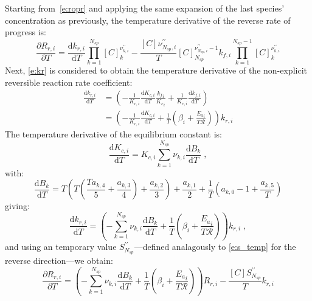 \documentclass[12pt,number,sort&compress]{elsarticle}
\newcommand{\ns}{N_{sp}}
\newcommand{\Ru}{\mathcal{R}}
\begin{document}
Starting from~\cref{e:ropr} and applying the same expansion of the last species' concentration as previously, the temperature derivative of the reverse rate of progress is:
\begin{equation}
 \label{e:droprdt_1}
 \frac{\partial R_{r, i}}{\partial T } = \frac{\text{d} k_{r, i} }{\text{d} T } \prod_{k=1}^{\ns} [C]_{k}^{\nu^{\prime\prime}_{k,i}} - \frac{[C] \nu^{\prime\prime}_{\ns,i}}{T} [C]_{\ns}^{\nu^{\prime\prime}_{\ns,i} - 1} {k_{f, i}} \prod_{k=1}^{\ns  - 1} [C]_{k}^{\nu^{\prime\prime}_{k,i}}
\end{equation}
Next, \cref{e:kr} is considered to obtain the temperature derivative of the non-explicit reversible reaction rate coefficient:
\begin{align}
 \frac{\text{d} k_{r, i} }{\text{d} T } &= \left(- \frac{1}{{K_{c, i}}} \frac{\text{d} {K_{c, i}} }{\text{d} T } \frac{{k_f}_i}{{K_c}_i} + \frac{1}{{K_{c, i}}}\frac{\text{d} {k_{f, i}} }{\text{d} T } \right) \nonumber \\
				         &= \left(- \frac{1}{{K_{c, i}}} \frac{\text{d} {K_{c, i}} }{\text{d} T } + \frac{1}{T} \left(\beta_{i} + \frac{{E_{a}}_{i}}{T \Ru}\right)\right) {k_{r, i}}
\end{align}
The temperature derivative of the equilibrium constant is:
\begin{equation}
 \frac{\text{d} {K_{c, i}} }{\text{d} T } = {K_{c, i}} \sum_{k=1}^{\ns} \nu_{k,i} \frac{\text{d} B_{k} }{\text{d} T } \;,
\end{equation}
with:
\begin{equation}
 \frac{\text{d} B_{k} }{\text{d} T } = T \left(T \left(\frac{T a_{k,4}}{5} + \frac{a_{k,3}}{4}\right) + \frac{a_{k,2}}{3}\right) + \frac{a_{k,1}}{2} + \frac{1}{T} \left(a_{k,0} - 1 + \frac{a_{k,5}}{T}\right)
\end{equation}
giving:
\begin{equation}
\label{e:dkr_dt}
\frac{\text{d} k_{r, i} }{\text{d} T } = \left(- \sum_{k=1}^{\ns} \nu_{k,i} \frac{\text{d} B_{k}}{\text{d} T } + \frac{1}{T} \left(\beta_{i} + \frac{{E_{a}}_{i}}{T \Ru}\right)\right) {k_{r, i}} \;,
\end{equation}
and using an temporary value $S^{\prime\prime}_{\ns}$---defined analagously to \cref{e:s_temp} for the reverse direction---we obtain:
\begin{equation}
\label{e:dropr_dt}
\frac{\partial R_{r, i}}{\partial T } = \left(- \sum_{k=1}^{\ns} \nu_{k,i} \frac{\text{d} B_{k}}{\text{d} T } + \frac{1}{T} \left(\beta_{i} + \frac{{E_{a}}_{i}}{T \Ru}\right)\right) {R_{r, i}} - \frac{[C] S^{\prime\prime}_{\ns}}{T} {k_{r, i}}
\end{equation}
\end{document}
